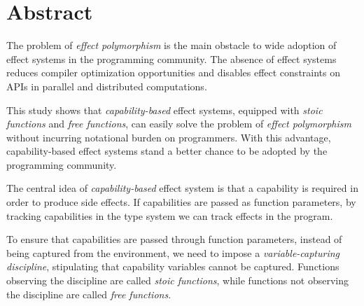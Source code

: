 \section*{\centering Abstract}

The problem of \emph{effect polymorphism} is the main obstacle to wide
adoption of effect systems in the programming community. The absence
of effect systems reduces compiler optimization opportunities and
disables effect constraints on APIs in parallel and distributed
computations.

This study shows that \emph{capability-based} effect systems, equipped
with \emph{stoic functions} and \emph{free functions}, can easily
solve the problem of \emph{effect polymorphism} without incurring
notational burden on programmers. With this advantage,
capability-based effect systems stand a better chance to be adopted by
the programming community.

The central idea of \emph{capability-based} effect system is that a
capability is required in order to produce side effects. If
capabilities are passed as function parameters, by tracking
capabilities in the type system we can track effects in the program.

To ensure that capabilities are passed through function parameters,
instead of being captured from the environment, we need to impose a
\emph{variable-capturing discipline}, stipulating that capability
variables cannot be captured. Functions observing the discipline are
called \emph{stoic functions}, while functions not observing the
discipline are called \emph{free functions}.
